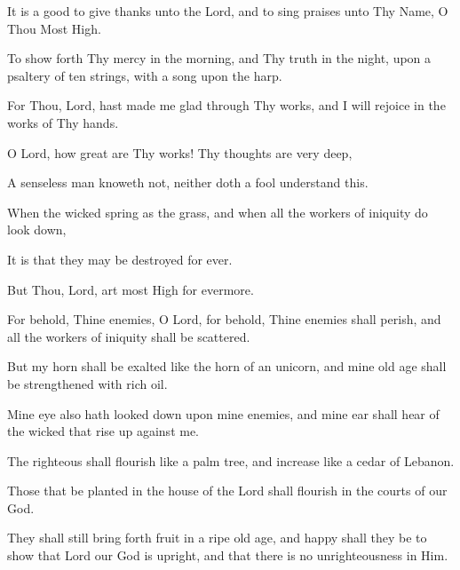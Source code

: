 It is a good to give thanks unto the Lord, and to sing praises unto Thy Name, O Thou Most High.

To show forth Thy mercy in the morning, and Thy truth in the night, upon a psaltery of ten strings, with a song upon the harp.

For Thou, Lord, hast made me glad through Thy works, and I will rejoice in the works of Thy hands.

O Lord, how great are Thy works! Thy thoughts are very deep,

A senseless man knoweth not, neither doth a fool understand this.

When the wicked spring as the grass, and when all the workers of iniquity do look down,

It is that they may be destroyed for ever.

But Thou, Lord, art most High for evermore.

For behold, Thine enemies, O Lord, for behold, Thine enemies shall perish, and all the workers of iniquity shall be scattered.

But my horn shall be exalted like the horn of an unicorn, and mine old age shall be strengthened with rich oil.

Mine eye also hath looked down upon mine enemies, and mine ear shall hear of the wicked that rise up against me.

The righteous shall flourish like a palm tree, and increase like a cedar of Lebanon.

Those that be planted in the house of the Lord shall flourish in the courts of our God.

They shall still bring forth fruit in a ripe old age, and happy shall they be to show that Lord our God is upright, and that there is no unrighteousness in Him.
